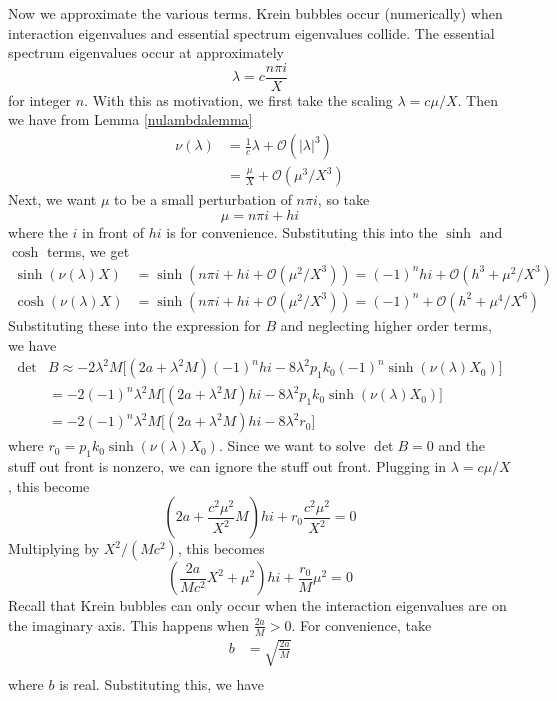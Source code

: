 \documentclass[thesis.tex]{subfiles}
\begin{document}
Now we approximate the various terms. Krein bubbles occur (numerically) when interaction eigenvalues and essential spectrum eigenvalues collide. The essential spectrum eigenvalues occur at approximately 
\[
\lambda = c \frac{n \pi i}{X}
\]
for integer $n$. With this as motivation, we first take the scaling $\lambda = c \mu / X$. Then we have from Lemma \ref{nulambdalemma}
\begin{align*}
\nu(\lambda) &= \frac{1}{c} \lambda + \mathcal{O}(|\lambda|^3) 
\\
&= \frac{\mu}{X} + \mathcal{O}(\mu^3 / X^3)
\end{align*}
Next, we want $\mu$ to be a small perturbation of $n \pi i$, so take 
\[
\mu = n \pi i + h i
\]
where the $i$ in front of $h i$ is for convenience. Substituting this into the $\sinh$ and $\cosh$ terms, we get
\begin{align*}
\sinh(\nu(\lambda)X) &= \sinh(n \pi i + h i + \mathcal{O}(\mu^2 / X^3)) = (-1)^n h i  + \mathcal{O}(h^3 + \mu^2 / X^3) \\
\cosh(\nu(\lambda)X) &= \sinh(n \pi i + h i + \mathcal{O}(\mu^2 / X^3)) = (-1)^n +  \mathcal{O}(h^2 + \mu^4 / X^6)
\end{align*}
Substituting these into the expression for $B$ and neglecting higher order terms, we have
\begin{align*}
\det &B \approx -2 \lambda^2 M \Big[ (2a + \lambda^2 M  ) (-1)^n h i - 8 \lambda^2 p_1 k_0 (-1)^n \sinh(\nu(\lambda)X_0) \Big] \\
&= -2 (-1)^n \lambda^2 M \Big[ (2a + \lambda^2 M  ) h i - 8 \lambda^2 p_1 k_0 \sinh(\nu(\lambda)X_0) \Big] \\
&= -2 (-1)^n \lambda^2 M \Big[ (2a + \lambda^2 M  ) h i - 8 \lambda^2 r_0 \Big]
\end{align*}
where $r_0 = p_1 k_0 \sinh(\nu(\lambda)X_0)$. Since we want to solve $\det B = 0$ and the stuff out front is nonzero, we can ignore the stuff out front. Plugging in $\lambda = c \mu / X$, this become
\[
\left(2a + \frac{c^2 \mu^2}{X^2} M\right) h i + r_0 \frac{c^2 \mu^2}{X^2} = 0
\]
Multiplying by $X^2/(M c^2)$, this becomes
\[
\left(\frac{2a}{M c^2} X^2 + \mu^2 \right) h i + \frac{r_0}{M}\mu^2 = 0
\]
Recall that Krein bubbles can only occur when the interaction eigenvalues are on the imaginary axis. This happens when $\frac{2a}{M} > 0$. For convenience, take
\begin{align*}
b &= \sqrt{ \frac{2a}{M} } \\
\end{align*}
where $b$ is real. Substituting this, we have
\end{document}
